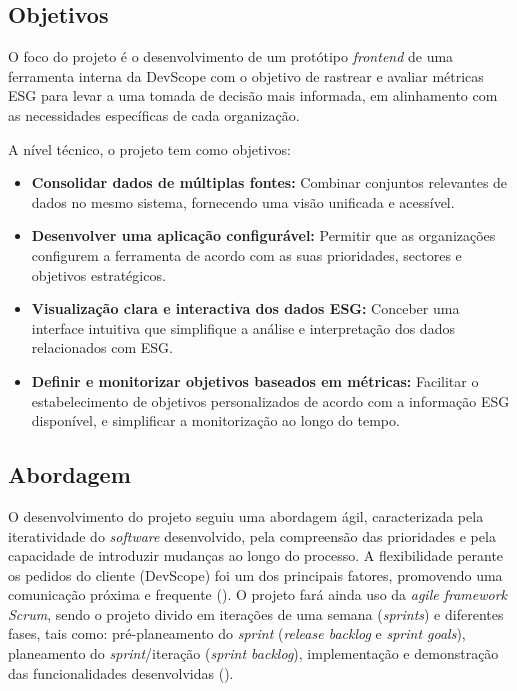 \subsection{Objetivos}

O foco do projeto é o desenvolvimento de um protótipo \textit{frontend} de uma ferramenta interna da DevScope com o objetivo de rastrear e avaliar métricas \gls{ESG} para levar a uma tomada de decisão mais informada, em alinhamento com as necessidades específicas de cada organização.

A nível técnico, o projeto tem como objetivos:

\begin{itemize}
\item \textbf{Consolidar dados de múltiplas fontes:} Combinar conjuntos relevantes de dados no mesmo sistema, fornecendo uma visão unificada e acessível.
\item \textbf{Desenvolver uma aplicação configurável:} Permitir que as organizações configurem a ferramenta de acordo com as suas prioridades, sectores e objetivos estratégicos.
\item \textbf{Visualização clara e interactiva dos dados ESG:} Conceber uma interface intuitiva que simplifique a análise e interpretação dos dados relacionados com ESG.
\item \textbf{Definir e monitorizar objetivos baseados em métricas:} Facilitar o estabelecimento de objetivos personalizados de acordo com a informação ESG disponível, e simplificar a monitorização ao longo do tempo.
\end{itemize}

\subsection{Abordagem} 

O desenvolvimento do projeto seguiu uma abordagem ágil, caracterizada pela iteratividade do \textit{software} desenvolvido, pela compreensão das prioridades e pela capacidade de introduzir mudanças ao longo do processo. A flexibilidade perante os pedidos do cliente (DevScope) foi um dos principais fatores, promovendo uma comunicação próxima e frequente (\cite{Patel2025}). O projeto fará ainda uso da \textit{agile framework Scrum}, sendo o projeto divido em iterações de uma semana (\textit{sprints}) e diferentes fases, tais como: pré-planeamento do \textit{sprint} (\textit{release backlog} e \textit{sprint goals}), planeamento do \textit{sprint}/iteração (\textit{sprint backlog}), implementação e demonstração das funcionalidades desenvolvidas (\cite{Cohen2004}).

